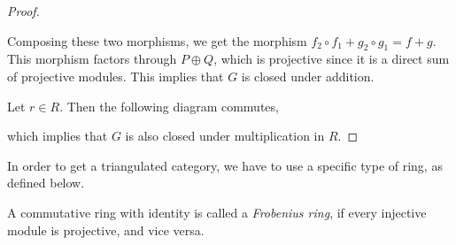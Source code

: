 \begin{proof}
\begin{center}
    \end{center}

    Composing these two morphisms, we get the morphism \( f_2 \circ f_1 + g_2 \circ g_1 = f + g \). This morphism factors through \( P \oplus Q \), which is projective since it is a direct sum of projective modules. This implies that \( G \) is closed under addition.
    
    Let \( r \in R \). Then the following diagram commutes,
    \begin{center}
    \end{center}
    which implies that \( G \) is also closed under multiplication in \( R \).
\end{proof}

In order to get a triangulated category, we have to use a specific type of ring, as defined below.
\begin{definition}
    A commutative ring with identity is called a \emph{Frobenius ring}, if every injective module is projective, and vice versa.
\end{definition}


